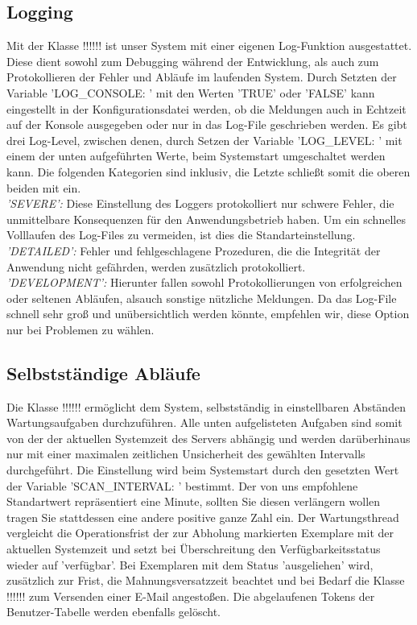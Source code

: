 \documentclass{article}
\begin{document}
\subsection{Logging}
Mit der Klasse !!!\hyperlink{}{}!!! ist unser System mit einer eigenen Log-Funktion ausgestattet. Diese dient sowohl zum Debugging während der Entwicklung, als auch zum Protokollieren der Fehler und Abläufe im laufenden System. Durch Setzten der Variable 'LOG\_CONSOLE: ' mit den Werten 'TRUE' oder 'FALSE' kann eingestellt in der Konfigurationsdatei werden, ob die Meldungen auch in Echtzeit auf der Konsole ausgegeben oder nur in das Log-File geschrieben werden. Es gibt drei Log-Level, zwischen denen, durch Setzen der Variable 'LOG\_LEVEL: ' mit einem der unten aufgeführten Werte, beim Systemstart umgeschaltet werden kann. Die folgenden Kategorien sind inklusiv, die Letzte schließt somit die oberen beiden mit ein. \\
\textit{'SEVERE':} Diese Einstellung des Loggers protokolliert nur schwere Fehler, die unmittelbare Konsequenzen für den Anwendungsbetrieb haben. Um ein schnelles Volllaufen des Log-Files zu vermeiden, ist dies die Standarteinstellung.\\
\textit{'DETAILED':} Fehler und fehlgeschlagene Prozeduren, die die Integrität der Anwendung nicht gefährden, werden zusätzlich protokolliert.\\
\textit{'DEVELOPMENT':} Hierunter fallen sowohl Protokollierungen von erfolgreichen oder seltenen Abläufen, alsauch sonstige nützliche Meldungen. Da das Log-File schnell sehr groß und unübersichtlich werden könnte, empfehlen wir, diese Option nur bei Problemen zu wählen.\\
\subsection{Selbstständige Abläufe}
Die Klasse !!!\hyperlink{}{}!!! ermöglicht dem System, selbstständig in einstellbaren Abständen Wartungsaufgaben durchzuführen. Alle unten aufgelisteten Aufgaben sind somit von der der aktuellen Systemzeit des Servers abhängig und werden darüberhinaus nur mit einer maximalen zeitlichen Unsicherheit des gewählten Intervalls durchgeführt. Die Einstellung wird beim Systemstart durch den gesetzten Wert der Variable 'SCAN\_INTERVAL: ' bestimmt. Der von uns empfohlene Standartwert repräsentiert eine Minute, sollten Sie diesen verlängern wollen tragen Sie stattdessen eine andere positive ganze Zahl ein. Der Wartungsthread vergleicht die Operationsfrist der zur Abholung markierten Exemplare mit der aktuellen Systemzeit und setzt bei Überschreitung den Verfügbarkeitsstatus wieder auf 'verfügbar'. Bei Exemplaren mit dem Status 'ausgeliehen' wird, zusätzlich zur Frist, die Mahnungsversatzzeit beachtet und bei Bedarf die Klasse !!!\hyperlink{}{}!!! zum Versenden einer E-Mail angestoßen. Die abgelaufenen Tokens der Benutzer-Tabelle werden ebenfalls gelöscht.
\end{document}
